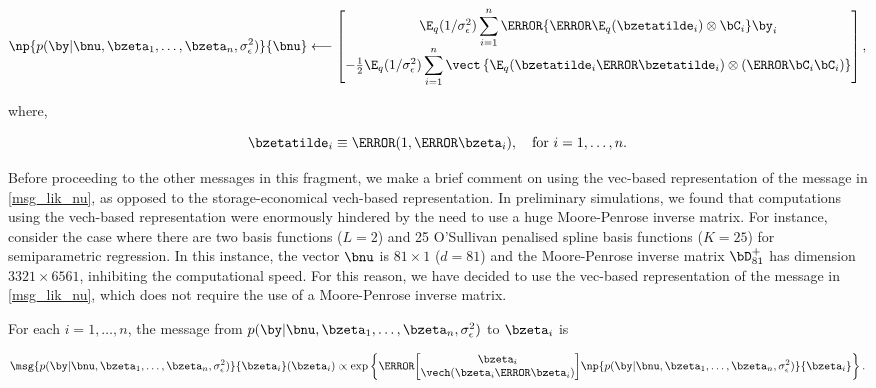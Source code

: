 \documentclass[12pt]{article}
\def\sigsqeps{\sigma^2_{\epsilon}}
\theoremstyle{plain}
\theoremstyle{definition}
\theoremstyle{remark}
\begin{document}
\begin{equation}
	\np{p (\by | \bnu, \bzeta_1, \dots, \bzeta_n, \sigsqeps)}{\bnu}
		\longleftarrow
			\begin{bmatrix}
				\E_q (1/\sigsqeps) \displaystyle\sum_{i=1}^n \T{\left\{
					\T{\E_q (\bzetatilde_i)} \otimes \bC_i
				\right\}} \by_i \\
				-\frac12 \E_q (1/\sigsqeps) \displaystyle\sum_{i=1}^n \vect \left\{
					\E_q (\bzetatilde_i \T{\bzetatilde_i}) \otimes (\T{\bC_i} \bC_i)
				\right\}
			\end{bmatrix},
\label{np_lik_nu}
\end{equation}

\noindent where, 

\begin{equation}
	\bzetatilde_i \equiv \T{(1, \T{\bzeta_i})}, \quad \text{for $i = 1, \dots, n$.}
\label{zeta_tilde}
\end{equation}

\noindent Before proceeding to the other messages in this fragment, we make a brief comment on using the vec-based
representation of the message in \eqref{msg_lik_nu}, as opposed to the storage-economical vech-based representation.
In preliminary simulations, we found that computations using the vech-based representation were enormously hindered
by the need to use a huge Moore-Penrose inverse matrix. For instance, consider the case where
there are two basis functions ($L = 2$) and 25 O'Sullivan penalised spline basis functions ($K = 25$) for semiparametric
regression. In this instance, the vector $\bnu$ is $81 \times 1$ ($d = 81$) and the Moore-Penrose inverse matrix
$\bD_{81}^+$ has dimension $3321 \times 6561$, inhibiting the computational speed. For this reason, we have
decided to use the vec-based representation of the message in \eqref{msg_lik_nu}, which does not require the
use of a Moore-Penrose inverse matrix.

For each $i = 1, \dots, n$, the message from $p (\by | \bnu, \bzeta_1, \dots, \bzeta_n, \sigsqeps)$ to $\bzeta_i$ is

\begin{equation}
	\msg{p (\by | \bnu, \bzeta_1, \dots, \bzeta_n, \sigsqeps)}{\bzeta_i} (\bzeta_i) \propto
		\exp \left\{
			\T{\begin{bmatrix}
				\bzeta_i \\
				\vech (\bzeta_i \T{\bzeta_i})
			\end{bmatrix}}
			\np{p (\by | \bnu, \bzeta_1, \dots, \bzeta_n, \sigsqeps)}{\bzeta_i}
		\right\}.
\label{msg_lik_zeta}
\end{equation}
\end{document}
